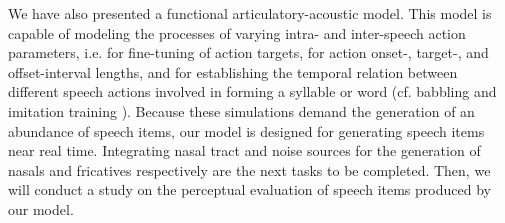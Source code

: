 \documentclass[conference]{IEEEtran}
\begin{document}
We have also presented a functional articulatory-acoustic model.
This model is capable of modeling the processes of varying
intra- and inter-speech action parameters, i.e. for fine-tuning of
action targets, for action onset-, target-, and offset-interval
lengths, and for establishing the temporal relation between
different speech actions involved in
forming a syllable or word (cf. babbling and
imitation training \cite{kroger2009,kroger2014}). Because these
simulations demand the generation of an abundance of speech items,
our model is designed for generating speech items near real time.
Integrating nasal tract and noise sources for the generation of nasals
and fricatives respectively are the next tasks to be completed.
Then, we will conduct a study on the perceptual evaluation
of speech items produced by our model.




\end{document}
